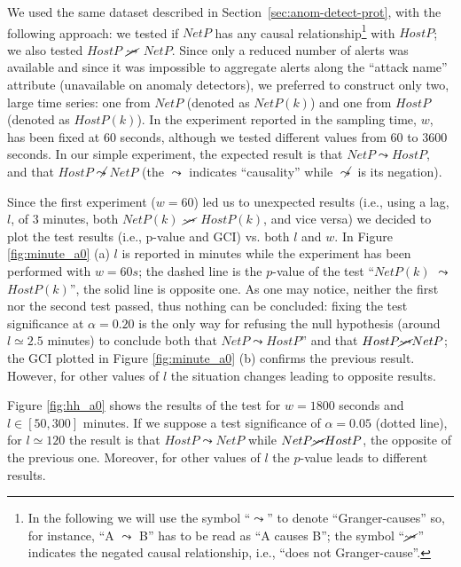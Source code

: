 We used the same dataset described in Section~\ref{sec:anom-detect-prot}, with the following approach: we tested if $NetP$ has any causal relationship\footnote{In the following we will use the symbol ``$\leadsto$'' to denote ``Granger-causes'' so, for instance, ``A $\leadsto$ B'' has to be read as ``A causes B''; the symbol ``$\cancel{\leadsto}$'' indicates the negated causal relationship, i.e., ``does not Granger-cause''.} with $HostP$; we also tested $HostP$ $\cancel{\leadsto}$ $NetP$. Since only a reduced number of alerts was available and since it was impossible to aggregate alerts along the ``attack name'' attribute (unavailable on anomaly detectors), we preferred to construct only two, large time series: one from $NetP$ (denoted as $NetP(k)$) and one from $HostP$ (denoted as $HostP(k)$). In the experiment reported in \citep{dblp:conf/raid/qinl03} the sampling time, $w$, has been fixed at 60 seconds, although we tested different values from 60 to 3600 seconds. In our simple experiment, the expected result is that $NetP \leadsto HostP$, and that $HostP \not\leadsto NetP$ (the $\leadsto$ indicates ``causality'' while $\not\leadsto$ is its negation).

Since the first experiment ($w = 60$) led us to unexpected results (i.e., using a lag, $l$, of $3$ minutes, both $NetP(k)$ $\cancel{\leadsto}$ $HostP(k)$, and vice versa) we decided to plot the test results (i.e., p-value and \ac{GCI}) vs. both $l$ and $w$. In Figure \ref{fig:minute_a0} (a) $l$ is reported in minutes while the experiment has been performed with $w = 60s$; the dashed line is the $p$-value of the test ``$NetP(k)$ $\leadsto$ $HostP(k)$'', the solid line is opposite one. As one may notice, neither the first nor the second test passed, thus nothing can be concluded: fixing the test significance at $\alpha = 0.20$ is the only way for refusing the null hypothesis (around $l \simeq 2.5$ minutes) to conclude both that $NetP \leadsto HostP$'' and that $HostP \cancel{\leadsto} NetP$; the \ac{GCI} plotted in Figure \ref{fig:minute_a0} (b) confirms the previous result. However, for other values of $l$ the situation changes leading to opposite results.

Figure \ref{fig:hh_a0} shows the results of the test for $w = 1800$ seconds and $l \in [50, 300]$ minutes. If we suppose a test significance of $\alpha = 0.05$ (dotted line), for $l \simeq 120$ the result is that $HostP \leadsto NetP$ while $NetP \cancel{\leadsto} HostP$, the opposite of the previous one. Moreover, for other values of $l$ the $p$-value leads to different results.


